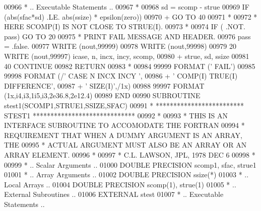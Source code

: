 \begin{DoxyCode}
00966 \textcolor{comment}{*     .. Executable Statements ..}
00967 \textcolor{comment}{*}
00968          sd = scomp - strue
00969          \textcolor{keywordflow}{IF} (abs(sfac*sd) .LE. abs(ssize) * epsilon(zero))
00970      +       \textcolor{keywordflow}{GO TO} 40
00971 \textcolor{comment}{*}
00972 \textcolor{comment}{*                             HERE    SCOMP(I) IS NOT CLOSE TO STRUE(I).}
00973 \textcolor{comment}{*}
00974          \textcolor{keywordflow}{IF} ( .NOT. pass) \textcolor{keywordflow}{GO TO} 20
00975 \textcolor{comment}{*                             PRINT FAIL MESSAGE AND HEADER.}
00976          pass = .false.
00977          \textcolor{keyword}{WRITE} (nout,99999)
00978          \textcolor{keyword}{WRITE} (nout,99998)
00979    20    \textcolor{keyword}{WRITE} (nout,99997) icase, n, incx, incy, scomp,
00980      +     strue, sd, ssize
00981    40 \textcolor{keywordflow}{CONTINUE}
00982       \textcolor{keywordflow}{RETURN}
00983 \textcolor{comment}{*}
00984 99999 \textcolor{keyword}{FORMAT} (\textcolor{stringliteral}{'                                       FAIL'})
00985 99998 \textcolor{keyword}{FORMAT} (/\textcolor{stringliteral}{' CASE  N INCX INCY                           '},
00986      +       \textcolor{stringliteral}{' COMP(I)                             TRUE(I)  DIFFERENCE'},
00987      +       \textcolor{stringliteral}{'     SIZE(I)'},/1x)
00988 99997 \textcolor{keyword}{FORMAT} (1x,i4,i3,1i5,i3,2e36.8,2e12.4)
00989 \textcolor{keyword}{      END}
00990 \textcolor{keyword}{      SUBROUTINE }stest1(SCOMP1,STRUE1,SSIZE,SFAC)
00991 \textcolor{comment}{*     ************************* STEST1 *****************************}
00992 \textcolor{comment}{*}
00993 \textcolor{comment}{*     THIS IS AN INTERFACE SUBROUTINE TO ACCOMODATE THE FORTRAN}
00994 \textcolor{comment}{*     REQUIREMENT THAT WHEN A DUMMY ARGUMENT IS AN ARRAY, THE}
00995 \textcolor{comment}{*     ACTUAL ARGUMENT MUST ALSO BE AN ARRAY OR AN ARRAY ELEMENT.}
00996 \textcolor{comment}{*}
00997 \textcolor{comment}{*     C.L. LAWSON, JPL, 1978 DEC 6}
00998 \textcolor{comment}{*}
00999 \textcolor{comment}{*     .. Scalar Arguments ..}
01000       \textcolor{keywordtype}{DOUBLE PRECISION}  scomp1, sfac, strue1
01001 \textcolor{comment}{*     .. Array Arguments ..}
01002       \textcolor{keywordtype}{DOUBLE PRECISION}  ssize(*)
01003 \textcolor{comment}{*     .. Local Arrays ..}
01004       \textcolor{keywordtype}{DOUBLE PRECISION}  scomp(1), strue(1)
01005 \textcolor{comment}{*     .. External Subroutines ..}
01006       \textcolor{keywordtype}{EXTERNAL}          stest
01007 \textcolor{comment}{*     .. Executable Statements ..}

\end{DoxyCode}
